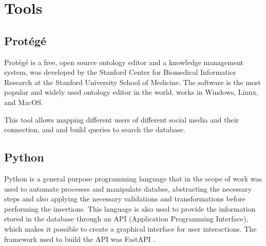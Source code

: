 \chapter{Tools}

\section{Protégé}

Protégé \cite{protege} is a free, open source ontology editor and a knowledge management system, was developed by the Stanford Center for Biomedical Informatics Research at the Stanford University School of Medicine. The software is the most popular and widely used ontology editor in the world, works in Windows, Linux, and MacOS.

This tool allows mapping different users of different social media and their connection, and and build queries to search the database.

\section{Python}
Python \cite{python} is a general purpose programming language that in the scope of work was used to automate processes and manipulate databse, abstracting the necessary steps and also applying the necessary validations and transformations before performing the insertions. 
This language is also used to provide the information stored in the database through an API (Application Programming Interface), which makes it possible to create a graphical interface for user interactions. The framework used to build the API was FastAPI \cite{fastapi}.

